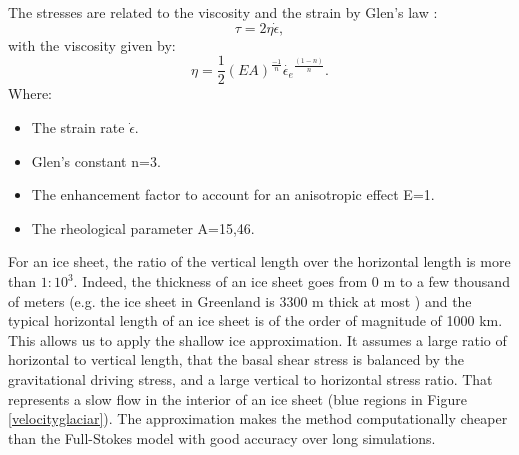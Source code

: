 \documentclass{article}
\begin{document}
The stresses are related to the viscosity and the strain by Glen's law \cite{glen1958flow}:
\begin{equation}
	\tau = 2\eta\dot{\epsilon},
\end{equation}
with the viscosity given by:
\begin{equation}
	\eta = \frac{1}{2}(EA)^\frac{-1}{n} \dot{\epsilon_e}^\frac{(1-n)}{n}.
\end{equation}
Where:
\begin{itemize}
	\item The strain rate $\dot{\epsilon}$.
	\item Glen's constant n=3.
	\item The enhancement factor to account for an anisotropic effect E=1.
	\item The rheological parameter A=15,46.
\end{itemize}
For an ice sheet, the ratio of the vertical length over the horizontal length is more than $1:10^3$. Indeed, the thickness of an ice sheet goes from 0 m to a few thousand of meters (e.g. the ice sheet in Greenland is 3300 m thick at most \cite[]{bamber2001new}) and the typical horizontal length of an ice sheet is of the order of magnitude of 1000 km. This allows us to apply the shallow ice approximation. It assumes a large ratio of horizontal to vertical length, that the basal shear stress is balanced by  the gravitational driving stress, and a large vertical to horizontal stress ratio. That represents a slow flow in the interior of an ice sheet (blue regions in Figure \ref{velocityglaciar}). The approximation makes the method computationally cheaper than the Full-Stokes model with good accuracy over long simulations.
\end{document}
